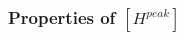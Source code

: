 \documentclass[structabstract]{stylefiles/aa}
\begin{document}
%

\subsubsection{Properties of $[H^{peak}]$}
\end{document}
